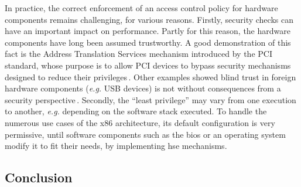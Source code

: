 In practice, the correct enforcement of an access control policy for hardware
components remains challenging, for various reasons.  Firstly, security checks
can have an important impact on performance.
%
Partly for this reason, the hardware components have long been assumed
trustworthy.
%
A good demonstration of this fact is the Address Translation Services mechanism
introduced by the PCI standard, whose purpose is to allow PCI devices to bypass
security mechanisms designed to reduce their
privileges\,\cite{daubignard2017protip}.
%
Other examples showed blind trust in foreign hardware components (\emph{e.g.}
USB devices) is not without consequences from a security
perspective\,\cite{nohl2014badusb,hudson2015thunderstrike,chifflier2013uefi}.
%
Secondly, the ``least privilege'' may vary from one execution to another,
\emph{e.g.} depending on the software stack executed.
%
To handle the numerous use cases of the x86 architecture, its default
configuration is very permissive, until software components such as the
\ac{bios} or an operating system modify it to fit their needs, by implementing
\ac{hse} mechanisms.


\subsection{Conclusion}

